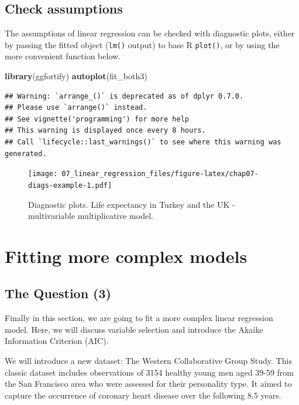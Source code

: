 \documentclass[
  12pt,
  krantz2]{krantz}
\makeatletter
\newenvironment{Shaded}{\begin{snugshade}}{\end{snugshade}}
\newcommand{\KeywordTok}[1]{\textcolor[rgb]{0.13,0.29,0.53}{\textbf{#1}}}
\newcommand{\NormalTok}[1]{#1}
\newenvironment{kframe}{%
\medskip{}
\setlength{\fboxsep}{.8em}
 \def\at@end@of@kframe{}%
 \ifinner\ifhmode%
  \def\at@end@of@kframe{\end{minipage}}%
  \begin{minipage}{\columnwidth}%
 \fi\fi%
 \def\FrameCommand##1{\hskip\@totalleftmargin \hskip-\fboxsep
 \colorbox{shadecolor}{##1}\hskip-\fboxsep
     \hskip-\linewidth \hskip-\@totalleftmargin \hskip\columnwidth}%
 \MakeFramed {\advance\hsize-\width
   \@totalleftmargin\z@ \linewidth\hsize
   \@setminipage}}%
 {\par\unskip\endMakeFramed%
 \at@end@of@kframe}
\renewenvironment{Shaded}{\begin{kframe}}{\end{kframe}}
\makeatother
\begin{document}
\hypertarget{check-assumptions}{%
\subsection{Check assumptions}\label{check-assumptions}}

The assumptions of linear regression can be checked with diagnostic plots, either by passing the fitted object (\texttt{lm()} output) to base R \texttt{plot()}, or by using the more convenient function below.

\begin{Shaded}
\begin{Highlighting}[]
\KeywordTok{library}\NormalTok{(ggfortify)}
\KeywordTok{autoplot}\NormalTok{(fit_both3)}
\end{Highlighting}
\end{Shaded}

\begin{verbatim}
## Warning: `arrange_()` is deprecated as of dplyr 0.7.0.
## Please use `arrange()` instead.
## See vignette('programming') for more help
## This warning is displayed once every 8 hours.
## Call `lifecycle::last_warnings()` to see where this warning was generated.
\end{verbatim}

\begin{figure}
\centering
\texttt{[image: 07\_linear\_regression\_files/figure-latex/chap07-diags-example-1.pdf]}
\caption{\label{fig:chap07-diags-example}Diagnostic plots. Life expectancy in Turkey and the UK - multivariable multiplicative model.}
\end{figure}

\hypertarget{fitting-more-complex-models}{%
\section{Fitting more complex models}\label{fitting-more-complex-models}}

\hypertarget{the-question-3}{%
\subsection{The Question (3)}\label{the-question-3}}

Finally in this section, we are going to fit a more complex linear regression model.
Here, we will discuss variable selection and introduce the Akaike Information Criterion (AIC).

We will introduce a new dataset: The Western Collaborative Group Study.
This classic dataset includes observations of 3154 healthy young men aged 39-59 from the San Francisco area who were assessed for their personality type.
It aimed to capture the occurrence of coronary heart disease over the following 8.5 years.
\end{document}
